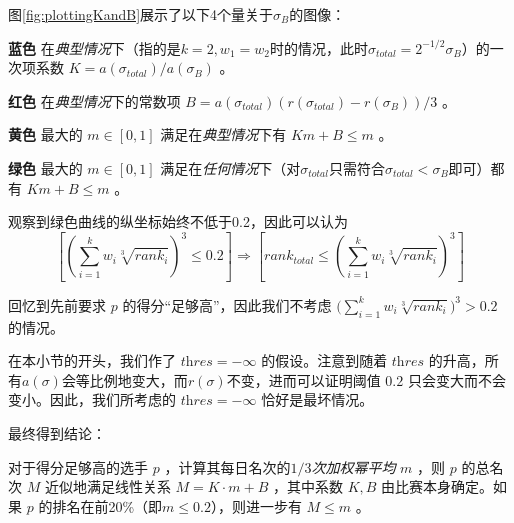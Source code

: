             图\ref{fig:plottingKandB}展示了以下4个量关于$\sigma_B$的图像：
            \begin{asparaitem}
                \vspace{1ex}
                \item [\textbf{蓝色}] 在\emph{典型情况}下（指的是$k=2,w_1=w_2$时的情况，此时$\sigma_{\textit{total}}=2^{-1/2}\sigma_B$）的一次项系数 $K=a(\sigma_{\textit{total}})/a(\sigma_B)$ 。
                \vspace{1ex}
                \item [\textbf{红色}] 在\emph{典型情况}下的常数项 $B=a(\sigma_{\textit{total}})\left(r(\sigma_{\textit{total}})-r(\sigma_B)\right)/3$ 。
                \vspace{1ex}
                \item [\textbf{黄色}] 最大的 $m\in [0,1]$ 满足在\emph{典型情况}下有 $Km+B\leq m$ 。
                \vspace{1ex}
                \item [\textbf{绿色}] 最大的 $m\in [0,1]$ 满足在\emph{任何情况}下（对$\sigma_{\textit{total}}$只需符合$\sigma_{\textit{total}}<\sigma_B$即可）都有 $Km+B\leq m$ 。
                \vspace{1ex}
            \end{asparaitem}

            观察到绿色曲线的纵坐标始终不低于0.2，因此可以认为
            $$
            \left[\left(\sum\limits_{i=1}^k w_i\sqrt[3]{\textit{rank}_i}\right)^3\leq 0.2\right]\Rightarrow
            \left[\textit{rank}_{\textit{total}}\leq\left(\sum\limits_{i=1}^k w_i\sqrt[3]{\textit{rank}_i}\right)^3\right]
            $$

            回忆到先前要求 $p$ 的得分“足够高”，因此我们不考虑 $\big(\sum_{i=1}^k w_i\sqrt[3]{\textit{rank}_i}\big)^3>0.2$ 的情况。

            在本小节的开头，我们作了 $\textit{thres}=-\infty$ 的假设。注意到随着 $\textit{thres}$ 的升高，所有$a(\sigma)$会等比例地变大，而$r(\sigma)$不变，进而可以证明阈值 $0.2$ 只会变大而不会变小。因此，我们所考虑的 $\textit{thres}=-\infty$ 恰好是最坏情况。

            \vspace{1.5ex}

            最终得到结论：

            \begin{tcolorbox}[colback=white,colframe=black,boxrule=0.5pt,arc=0pt]
                对于得分足够高的选手 $p$ ，计算其每日名次的\emph{$1/3$次加权幂平均} $m$ ，则 $p$ 的总名次 $M$ 近似地满足线性关系 $M=K\cdot m+B$ ，其中系数 $K,B$ 由比赛本身确定。如果 $p$ 的排名在前20\%（即$m\leq 0.2$），则进一步有 $M\leq m$ 。
            \end{tcolorbox}

